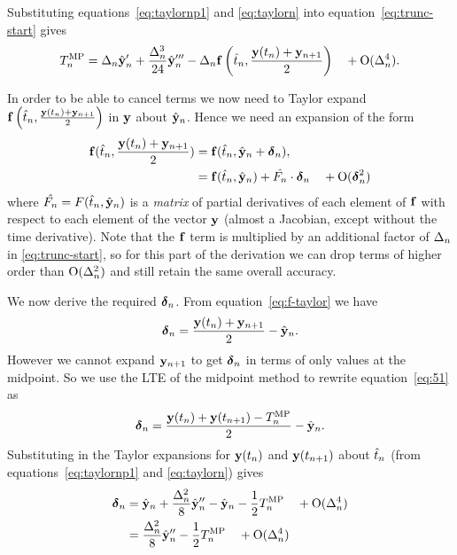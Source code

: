 Substituting equations~\eqref{eq:taylornp1} and \eqref{eq:taylorn} into equation~\eqref{eq:trunc-start} gives
\begin{equation}
  T_n^{\text{MP}} = \Delta_{n} \hat{\mathbf{y}}_{n}' + \frac{\Delta_{n}^3}{24} \hat{\mathbf{y}}_{n}'''
  - \Delta_{n} {\mathbf{f}}\left( \hat{t}_{n}, \frac{\mathbf{y}(t_n) + \mathbf{y}_{n+1}}{2} \right)  \quad + \text{O}(\Delta_{n}^4).
  \label{eq:trunc-mid}
\end{equation}

In order to be able to cancel terms we now need to Taylor expand ${\mathbf{f}}\left( \hat{t}_{n}, \frac{\mathbf{y}(t_n) + \mathbf{y}_{n+1}}{2} \right)$ in $\mathbf{y}$ about $\hat{\mathbf{y}}_{n}$.
Hence we need an expansion of the form
\begin{align}
 {\mathbf{f}}(\hat{t}_{n}, \frac{\mathbf{y}(t_n) + \mathbf{y}_{n+1}}{2}) &= {\mathbf{f}}(\hat{t}_{n}, \hat{\mathbf{y}}_{n} + \mbox{\boldmath$\delta$}_{n}),
 \notag \\
 &= {\mathbf{f}}(\hat{t}_{n}, \hat{\mathbf{y}}_{n}) + \hat{F_{n}} \cdot \mbox{\boldmath$\delta$}_{n}  \quad + \text{O}(\mbox{\boldmath$\delta$}_{n}^2)
 \label{eq:f-taylor}
\end{align}
where $\hat{F_{n}} = F(\hat{t}_{n}, \hat{\mathbf{y}}_{n})$ is a \emph{matrix} of partial derivatives of each element of ${\mathbf{f}}$ with respect to each element of the vector $\mathbf{y}$ (\ie almost a Jacobian, except without the time derivative).
Note that the ${\mathbf{f}}$ term is multiplied by an additional factor of $\Delta_{n}$ in \eqref{eq:trunc-start}, so for this part of the derivation we can drop terms of higher order than $\text{O}(\Delta_{n}^2)$ and still retain the same overall accuracy.

We now derive the required $\mbox{\boldmath$\delta$}_{n}$.
From equation~\eqref{eq:f-taylor} we have
\begin{equation}
  \mbox{\boldmath$\delta$}_{n} = \frac{\mathbf{y}(t_n) + \mathbf{y}_{n+1}}{2} - \hat{\mathbf{y}}_{n}.
  \label{eq:51}
\end{equation}
However we cannot expand $\mathbf{y}_{n+1}$ to get $\mbox{\boldmath$\delta$}_{n}$ in terms of only values at the midpoint.
So we use the LTE of the midpoint method to rewrite equation~\eqref{eq:51} as
\begin{equation}
   \mbox{\boldmath$\delta$}_{n} = \frac{\mathbf{y}(t_n) + \mathbf{y}(t_{n+1}) - T_n^{\text{MP}}}{2} - \hat{\mathbf{y}}_{n}.
\end{equation}
Substituting in the Taylor expansions for $\mathbf{y}(t_n)$ and $\mathbf{y}(t_{n+1})$ about $\hat{t}_{n}$ (from equations~\eqref{eq:taylornp1} and \eqref{eq:taylorn}) gives
\begin{align}
  \mbox{\boldmath$\delta$}_{n} &= \hat{\mathbf{y}}_{n} + \frac{\Delta_{n}^2}{8} \hat{\mathbf{y}}_{n}'' - \hat{\mathbf{y}}_{n} - \frac{1}{2} T_n^{\text{MP}} \quad + \text{O}(\Delta_{n}^4) \notag\\
  &= \frac{\Delta_{n}^2}{8} \hat{\mathbf{y}}_{n}'' - \frac{1}{2} T_n^{\text{MP}} \quad + \text{O}(\Delta_{n}^4)
  \label{eq:dy-value}
\end{align}

